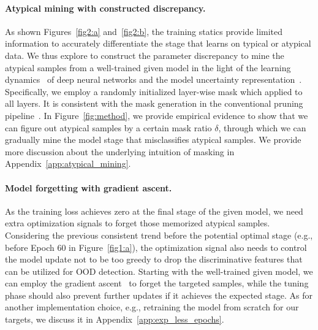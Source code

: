 \documentclass{article}
\theoremstyle{plain}
\theoremstyle{definition}
\theoremstyle{remark}
\begin{document}
\paragraph{Atypical mining with constructed discrepancy.}  
As shown Figures~\ref{fig2:a} and~\ref{fig2:b}, the training statics provide limited information to accurately differentiate the stage that learns on typical or atypical data. We thus explore to construct the parameter discrepancy to mine the atypical samples from a well-trained given model in the light of the learning dynamics~\citep{goodfellow2016deep, arpit2017closer} of deep neural networks and the model uncertainty representation~\citep{gal2016dropout}. Specifically, we employ a randomly initialized layer-wise mask which applied to all layers. It is consistent with the mask generation in the conventional pruning pipeline~\citep{han2015deep}. In Figure~\ref{fig:method}, we provide empirical evidence to show that we can figure out atypical samples by a certain mask ratio $\delta$, through which we can gradually mine the model stage that misclassifies atypical samples. We provide more discussion about the underlying intuition of masking in Appendix~\ref{app:atypical_mining}.

\paragraph{Model forgetting with gradient ascent.}
As the training loss achieves zero at the final stage of the given model, we need extra optimization signals to forget those memorized atypical samples. Considering the previous consistent trend before the potential optimal stage (e.g., before Epoch 60 in Figure~\ref{fig1:a}), the optimization signal also needs to control the model update not to be too greedy to drop the discriminative features that can be utilized for OOD detection. Starting with the well-trained given model, we can employ the gradient ascent~\citep{sorg2010reward, ishida2020we} to forget the targeted samples, while the tuning phase should also prevent further updates if it achieves the expected stage. As for another implementation choice, e.g., retraining the model from scratch for our targets, we discuss it in Appendix~\ref{app:exp_less_epochs}.
\end{document}
